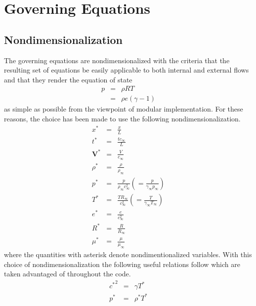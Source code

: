 
\section{Governing Equations}

\subsection{Nondimensionalization}

The governing equations are nondimensionalized with the criteria that the resulting set of equations be easily applicable to both internal and external flows and that they render the equation of state
\begin{eqnarray*}
p &=& \rho R T \\
  &=& \rho e \left(\gamma - 1\right)
\end{eqnarray*}
as simple as possible from the viewpoint of modular implementation. For these reasons, the choice has been made to use the following nondimensionalization.
\begin{eqnarray*}
x^* &=& \frac{x}{L} \\
t^* &=& \frac{t c_{\infty}}{L} \\
\mathbf{V}^* &=& \frac{V}{c_{\infty}} \\
\rho^* &=& \frac{\rho}{\rho_\infty} \\
p^* &=& \frac{p}{\rho_\infty c_\infty^2} \left( = \frac{p}{\gamma_\infty p_\infty} \right) \\
T^* &=& \frac{T R_\infty}{c_\infty^2} \left( = \frac{T}{\gamma_\infty T_\infty} \right) \\
e^* &=& \frac{e}{c_\infty^2} \\
R^* &=& \frac{R}{R_\infty} \\
\mu^* &=& \frac{\mu}{\mu_\infty}
\end{eqnarray*}
where the quantities with asterisk denote nondimentionalized variables. With this choice of nondimensionalization the following useful relations follow which are taken advantaged of throughout the code.
\begin{eqnarray*}
{c^*}^2 &=& \gamma T^* \\
p^* &=& \rho^* T^*
\end{eqnarray*}

